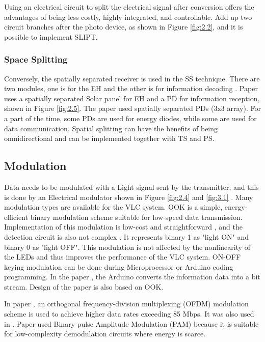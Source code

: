 Using an electrical circuit to split the electrical signal after conversion offers the advantages of being less costly, highly integrated, and controllable. Add up two circuit branches after the photo device, as shown in Figure \ref{fig:2.2}, and it is possible to implement \ac{SLIPT}\cite{wang2015design}. 

\subsubsection{Space Splitting}
Conversely, the spatially separated receiver is used in the \ac{SS} technique. There are two modules, one is for the \ac{EH} and the other is for information decoding \cite{de2024reconfigurable}. Paper \cite{ma2019simultaneous} uses a spatially separated Solar panel for \ac{EH} and a \ac{PD} for information reception, shown in Figure \ref{fig:2.5}. The paper \cite{de2024reconfigurable} used spatially separated \ac{PD}s (3x3 array). For a part of the time, some \ac{PD}s are used for energy diodes, while some are used for data communication. 
Spatial splitting can have the benefits of being omnidirectional and can be implemented together with \ac{TS} and \ac{PS}\cite{de2024reconfigurable}.

\subsection{Modulation}

Data needs to be modulated with a Light signal sent by the transmitter, and this is done by an Electrical modulator shown in Figure \ref{fig:2.4} and  \ref{fig:3.1} \cite{ma2019simultaneous} \cite{diamantoulakis2018simultaneous}. Many modulation types are available for the \ac{VLC} system. \ac{OOK} is a simple, energy-efficient binary modulation scheme suitable for low-speed data transmission. Implementation of this modulation is low-cost and straightforward \cite{mahmoud2022design}\cite{6757172}, and the detection circuit is also not complex \cite{wang2022high}. It represents binary 1 as "light ON" and binary 0 as "light OFF". This modulation is not affected by the nonlinearity of the LEDs and thus improves the performance of the \ac{VLC} system. ON-OFF keying modulation can be done during Microprocessor or Arduino coding programming. In the paper \cite{mahmoud2022design}, the Arduino converts the information data into a bit stream. Design of the paper \cite{thongsa2018design} is also based on \ac{OOK}.

In paper \cite{de2024reconfigurable}, an orthogonal frequency-division multiplexing (OFDM) modulation scheme is used to achieve higher data rates exceeding 85 Mbps. It was also used in \cite{wang2015design}. Paper \cite{fan2017circuit} used Binary pulse Amplitude Modulation (PAM) because it is suitable for low-complexity demodulation circuits where energy is scarce. 


